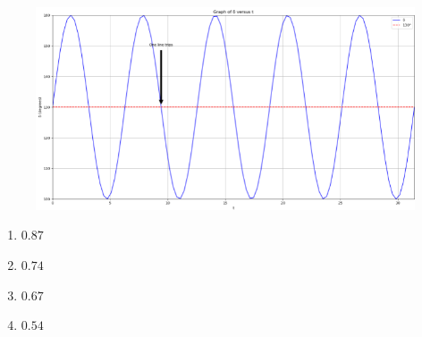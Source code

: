 \begin{figure}[!ht]
    \centering
    \includegraphics[width=\linewidth]{GATE-yearwise/GATE(1)/figs/13.png}
    \caption{}
    \label{fig:13}
\end{figure}
\begin{multicols}{4}
\begin{enumerate}
    \item $0.87$
    \item $0.74$
    \item $0.67$
    \item $0.54$
\end{enumerate}
\end{multicols}
    \bigskip
